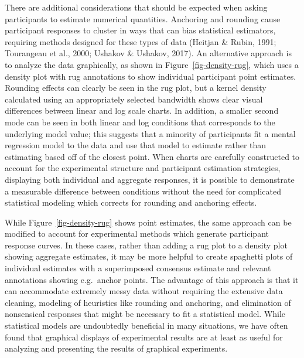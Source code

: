 \documentclass[
  10pt,
  letterpaper,
  DIV=11,
  numbers=noendperiod]{scrartcl}
\begin{document}
There are additional considerations that should be expected when asking
participants to estimate numerical quantities. Anchoring and rounding
cause participant responses to cluster in ways that can bias statistical
estimators, requiring methods designed for these types of data (Heitjan
\& Rubin, 1991; Tourangeau et al., 2000; Ushakov \& Ushakov, 2017). An
alternative approach is to analyze the data graphically, as shown in
Figure~\ref{fig-density-rug}, which uses a density plot with rug
annotations to show individual participant point estimates. Rounding
effects can clearly be seen in the rug plot, but a kernel density
calculated using an appropriately selected bandwidth shows clear visual
differences between linear and log scale charts. In addition, a smaller
second mode can be seen in both linear and log conditions that
corresponds to the underlying model value; this suggests that a minority
of participants fit a mental regression model to the data and use that
model to estimate rather than estimating based off of the closest point.
When charts are carefully constructed to account for the experimental
structure and participant estimation strategies, displaying both
individual and aggregate responses, it is possible to demonstrate a
measurable difference between conditions without the need for
complicated statistical modeling which corrects for rounding and
anchoring effects.

While Figure~\ref{fig-density-rug} shows point estimates, the same
approach can be modified to account for experimental methods which
generate participant response curves. In these cases, rather than adding
a rug plot to a density plot showing aggregate estimates, it may be more
helpful to create spaghetti plots of individual estimates with a
superimposed consensus estimate and relevant annotations showing
e.g.~anchor points. The advantage of this approach is that it can
accommodate extremely messy data without requiring the extensive data
cleaning, modeling of heuristics like rounding and anchoring, and
elimination of nonsensical responses that might be necessary to fit a
statistical model. While statistical models are undoubtedly beneficial
in many situations, we have often found that graphical displays of
experimental results are at least as useful for analyzing and presenting
the results of graphical experiments.
\end{document}
